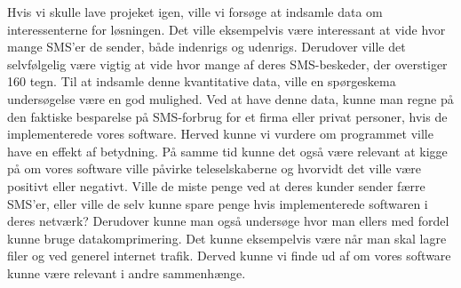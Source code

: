 Hvis vi skulle lave projeket igen, ville vi forsøge at indsamle data om interessenterne for løsningen. Det ville eksempelvis være interessant at vide hvor mange SMS'er de sender, både indenrigs og udenrigs. Derudover ville det selvfølgelig være vigtig at vide hvor mange af deres SMS-beskeder, der overstiger 160 tegn. Til at indsamle denne kvantitative data, ville en spørgeskema undersøgelse være en god mulighed. Ved at have denne data, kunne man regne på den faktiske besparelse på SMS-forbrug for et firma eller privat personer, hvis de implementerede vores software. Herved kunne vi vurdere om programmet ville have en effekt af betydning. 
På samme tid kunne det også være relevant at kigge på om vores software ville påvirke teleselskaberne og hvorvidt det ville være positivt eller negativt. Ville de miste penge ved at deres kunder sender færre SMS'er, eller ville de selv kunne spare penge hvis implementerede softwaren i deres netværk?
Derudover kunne man også undersøge hvor man ellers med fordel kunne bruge datakomprimering. Det kunne eksempelvis være når man skal lagre filer og ved generel internet trafik. Derved kunne vi finde ud af om vores software kunne være relevant i andre sammenhænge.